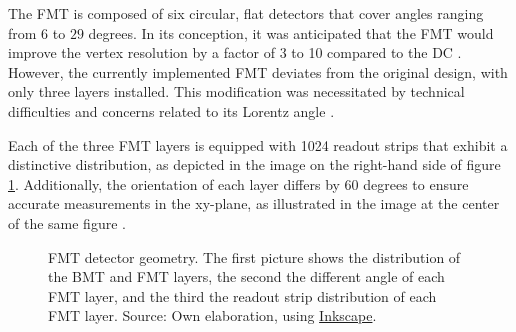     The FMT is composed of six circular, flat detectors that cover angles ranging from $6$ to $29$ degrees.
    In its conception, it was anticipated that the FMT would improve the vertex resolution by a factor of 3 to 10 compared to the DC \cite{aune2009}.
    However, the currently implemented FMT deviates from the original design, with only three layers installed.
    This modification was necessitated by technical difficulties and concerns related to its Lorentz angle \cite{konczykowski2010}.

    Each of the three FMT layers is equipped with 1024 readout strips that exhibit a distinctive distribution, as depicted in the image on the right-hand side of figure \ref{fig::fmt_geometry}.
    Additionally, the orientation of each layer differs by 60 degrees to ensure accurate measurements in the xy-plane, as illustrated in the image at the center of the same figure \cite{acker2020mvt}.

    \begin{figure}[t]
        \centering{}
        \caption[FMT detector geometry.]{FMT detector geometry. The first picture shows the distribution of the BMT and FMT layers, the second the different angle of each FMT layer, and the third the readout strip distribution of each FMT layer.
        Source: Own elaboration, using \hyperlink{inkscape.org/}{Inkscape}.}
        \label{fig::fmt_geometry}
    \end{figure}

    
